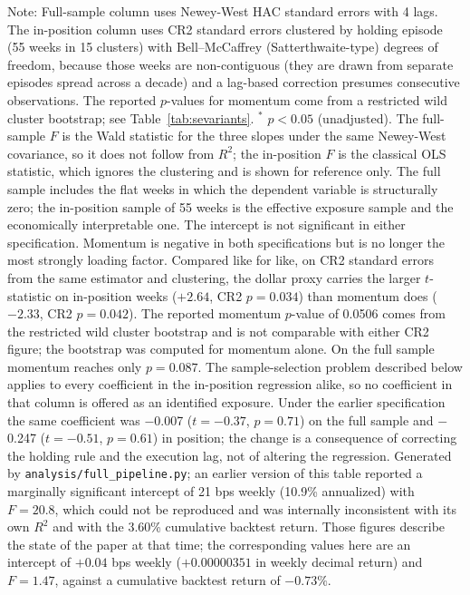 \documentclass[11pt]{article}
\begin{document}
\begin{table}[H]
\parbox{\linewidth}{\footnotesize Note: Full-sample column uses Newey-West HAC standard errors with 4 lags. The in-position column uses CR2 standard errors clustered by holding episode (55 weeks in 15 clusters) with Bell--McCaffrey (Satterthwaite-type) degrees of freedom, because those weeks are non-contiguous (they are drawn from separate episodes spread across a decade) and a lag-based correction presumes consecutive observations. The reported $p$-values for momentum come from a restricted wild cluster bootstrap; see Table~\ref{tab:sevariants}. $^{*}$ $p < 0.05$ (unadjusted). The full-sample $F$ is the Wald statistic for the three slopes under the same Newey-West covariance, so it does not follow from $R^2$; the in-position $F$ is the classical OLS statistic, which ignores the clustering and is shown for reference only. The full sample includes the flat weeks in which the dependent variable is structurally zero; the in-position sample of 55 weeks is the effective exposure sample and the economically interpretable one. The intercept is not significant in either specification. Momentum is negative in both specifications but is no longer the most strongly loading factor. Compared like for like, on CR2 standard errors from the same estimator and clustering, the dollar proxy carries the larger $t$-statistic on in-position weeks ($+2.64$, CR2 $p = 0.034$) than momentum does ($-2.33$, CR2 $p = 0.042$). The reported momentum $p$-value of 0.0506 comes from the restricted wild cluster bootstrap and is not comparable with either CR2 figure; the bootstrap was computed for momentum alone. On the full sample momentum reaches only $p = 0.087$. The sample-selection problem described below applies to every coefficient in the in-position regression alike, so no coefficient in that column is offered as an identified exposure. Under the earlier specification the same coefficient was $-$0.007 ($t = -0.37$, $p = 0.71$) on the full sample and $-$0.247 ($t = -0.51$, $p = 0.61$) in position; the change is a consequence of correcting the holding rule and the execution lag, not of altering the regression. Generated by \texttt{analysis/full\_pipeline.py}; an earlier version of this table reported a marginally significant intercept of 21 bps weekly (10.9\% annualized) with $F = 20.8$, which could not be reproduced and was internally inconsistent with its own $R^2$ and with the 3.60\% cumulative backtest return. Those figures describe the state of the paper at that time; the corresponding values here are an intercept of $+0.04$ bps weekly ($+0.00000351$ in weekly decimal return) and $F = 1.47$, against a cumulative backtest return of $-0.73\%$.}
\end{table}
\end{document}
